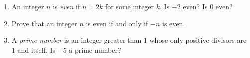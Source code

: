 \begin{enumerate}
\item[(a)] An integer $n$ is \emph{even} if $n=2k$ for some integer $k$. Is $-2$ even? Is $0$ even?
\item[(b)] Prove that an integer $n$ is even if and only if $-n$ is even.
\item[(c)] A \emph{prime number} is an integer greater than $1$ whose only positive divisors are $1$ and itself. Is $-5$ a prime number?
\end{enumerate}
